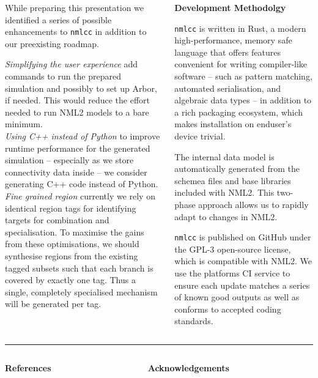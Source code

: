 \documentclass{beamer}
\begin{document}
\begin{frame}[t, fragile]
\begin{columns}[t]
\begin{column}[t]{0.49\textwidth}
      While preparing this presentation we identified a series of possible
      enhancements to \texttt{nmlcc} in addition to our preexisting roadmap.

      \emph{Simplifying the user experience} add commands to run the prepared
      simulation and possibly to set up Arbor, if needed. This would reduce the
      effort needed to run NML2 models to a bare minimum.\\[1.5ex]
      \emph{Using C++ instead of Python} to improve runtime performance for the
      generated simulation -- especially as we store connectivity data inside --
      we consider generating C++ code instead of Python.\\[1.5ex]
      \emph{Fine grained region} currently we rely on identical region tags for
      identifying targets for combination and specialisation. To maximise the
      gains from these optimisations, we should synthesise regions from the
      existing tagged subsets such that each branch is covered by exactly one
      tag. Thus a single, completely specialised mechanism will be generated per
      tag.
    \end{column}
    \begin{column}[t]{0.49\textwidth}
      \textbf{Development Methodolgy}

      \texttt{nmlcc} is written in Rust, a modern high-performance, memory safe
      language that offers features convenient for writing compiler-like
      software -- such as pattern matching, automated serialisation, and
      algebraic data types -- in addition to a rich packaging ecosystem, which
      makes installation on enduser's device trivial.

      The internal data model is automatically generated from the schemea files
      and base libraries included with NML2. This two-phase approach allows us
      to rapidly adapt to changes in NML2.

      \texttt{nmlcc} is published on GitHub under the GPL-3 open-source license,
      which is compatible with NML2. We use the platforms CI service to ensure
      each update matches a series of known good outputs as well as conforms to
      accepted coding standards.
    \end{column}
  \end{columns}
  \vspace*{1ex}
  \textcolor{arbgrey}{\rule{\textwidth}{0.5ex}}
  \vspace*{-1ex}
  \begin{columns}
    \begin{column}{0.49\textwidth}
      \textbf{References}
    \end{column}
    \begin{column}{0.49\textwidth}
      \textbf{Acknowledgements}


\end{column}
\end{columns}
\end{frame}
\end{document}
